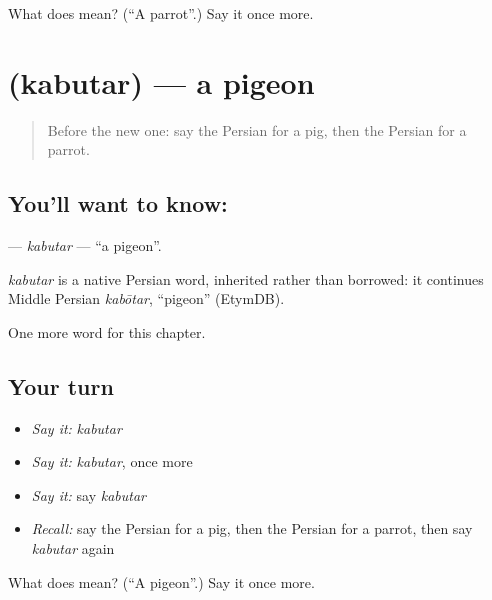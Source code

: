 \begin{tcolorbox}[breakable,colback=teal!4,colframe=teal!35!black,title={Before you move on}]
What does  mean? (\textquotedblleft{}A parrot\textquotedblright{}.) Say it once more.
\end{tcolorbox}
\section[\texorpdfstring{\fa{کبوتر} (kabutar)}{کبوتر (kabutar)}]{ (kabutar) — a pigeon}

\label{lesson:FA-C106-kabutar}



\begin{quote}
Before the new one: say the Persian for a pig, then the Persian for a parrot.
\end{quote}

\subsection*{You'll want to know: }
\textbf{} — \emph{kabutar} — \textquotedblleft{}a pigeon\textquotedblright{}.

\begin{cousinweb}
\emph{kabutar} is a native Persian word, inherited rather than borrowed: it continues Middle Persian \emph{kabōtar}, \textquotedblleft{}pigeon\textquotedblright{} (EtymDB).
\end{cousinweb}

\begin{grammarlens}[title={What you've built}]
One more word for this chapter.
\end{grammarlens}

\subsection*{Your turn}
\begin{itemize}
\raggedright
  \item \emph{Say it:} \emph{kabutar}
  \item \emph{Say it:} \emph{kabutar}, once more
  \item \emph{Say it:} say \emph{kabutar}
  \item \emph{Recall:} say the Persian for a pig, then the Persian for a parrot, then say \emph{kabutar} again
\end{itemize}

\begin{tcolorbox}[breakable,colback=teal!4,colframe=teal!35!black,title={Before you move on}]
What does  mean? (\textquotedblleft{}A pigeon\textquotedblright{}.) Say it once more.
\end{tcolorbox}
